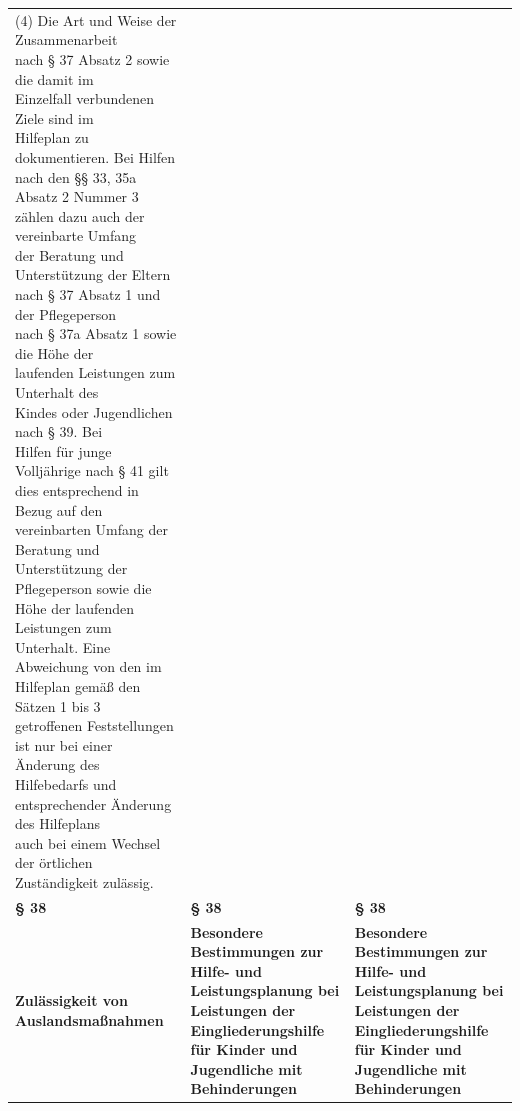 \documentclass[10pt,a4paper,landscape]{article}
\begin{document}
\begin{longtable}{|L{8.2cm}|L{8.2cm}|L{8.2cm}|}
\textcolor{diffred}{(4) Die Art und Weise der Zusammenarbeit  \newline nach \S{} 37 Absatz 2 sowie die damit im  \newline Einzelfall verbundenen Ziele sind im  \newline Hilfeplan zu dokumentieren. Bei Hilfen  \newline nach den \S{}\S{} 33, 35a Absatz 2 Nummer 3  \newline zählen dazu auch der vereinbarte Umfang  \newline der Beratung und Unterstützung der Eltern  \newline nach \S{} 37 Absatz 1 und der Pflegeperson  \newline nach \S{} 37a Absatz 1 sowie die Höhe der  \newline laufenden Leistungen zum Unterhalt des  \newline Kindes oder Jugendlichen nach \S{} 39. Bei  \newline Hilfen für junge Volljährige nach \S{} 41 gilt  \newline dies entsprechend in Bezug auf den  \newline vereinbarten Umfang der Beratung und  \newline Unterstützung der Pflegeperson sowie die  \newline Höhe der laufenden Leistungen zum  \newline Unterhalt. Eine Abweichung von den im  \newline Hilfeplan gemäß den Sätzen 1 bis 3  \newline getroffenen Feststellungen ist nur bei einer  \newline Änderung des Hilfebedarfs und  \newline entsprechender Änderung des Hilfeplans  \newline auch bei einem Wechsel der örtlichen  \newline Zuständigkeit zulässig. } &  &  \\
\hhline{|---|}
\textbf{\S{} 38} & \textbf{\S{} 38} & \textbf{\S{} 38} \\
\hhline{|---|}
\textbf{\textcolor{diffred}{Zulässigkeit von Auslandsmaßnahmen}} & \textbf{Besondere Bestimmungen zur Hilfe- und  \newline Leistungsplanung bei Leistungen der  \newline Eingliederungshilfe für Kinder und  \newline Jugendliche mit Behinderungen } & \textbf{Besondere Bestimmungen zur Hilfe- und  \newline Leistungsplanung bei Leistungen der  \newline Eingliederungshilfe für Kinder und  \newline Jugendliche mit Behinderungen } \\

\end{longtable}
\end{document}
